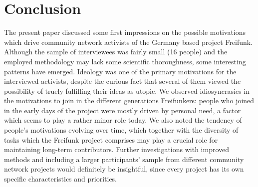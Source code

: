 \section{Conclusion}

The present paper discussed some first impressions on the possible motivations which drive community network activists of the Germany based project Freifunk.
Although the sample of interviewees was fairly small (16 people) and the employed methodology may lack some scientific thoroughness, some interesting patterns have emerged.
Ideology was one of the primary motivations for the interviewed activists, despite the curious fact that several of them viewed the possibility of truely fulfilling their ideas as utopic.
We observed idiosyncrasies in the motivations to join in the different generations Freifunkers:
people who joined in the early days of the project were mostly driven by personal need, a factor which seems to play a rather minor role today.
We also noted the tendency of people's motivations evolving over time,
which together with the diversity of tasks which the Freifunk project comprises may play a crucial role for maintaining long-term contributors.
Further investigations with improved methods and including a larger participants' sample from different community network projects would definitely be insightful, since every project has its own specific characteristics and priorities.


\begin{comment}
* an investigation of further community network projects would definitely be insightful, since all of them have sometimes quite different aspects, ideas, definitions, motivations

* not clear whether such a comparison is really valid: methods for gathering results in both domains vary widely

* Die Papers beschäftigen sich (vor allem) mit der Motivation von Entwickler*innen. Allerdings gibt es auch andere Möglichkeiten zu beiden Communities beizutragen (user documentation, publicity, design, Übersetzung, ...). Kann man sich da andere Motivationen vorstellen?

* critical discussion of the own methodology
\end{comment}
